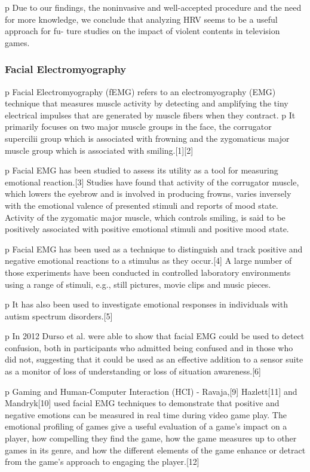 \documentclass{uofsthesis-cs}
\begin{document}
p Due to our findings, the noninvasive and well-accepted procedure and the need for more knowledge, we conclude that analyzing HRV seems to be a useful approach for fu- ture studies on the impact of violent contents in television games.



\subsubsection{Facial Electromyography}

p Facial Electromyography (fEMG) refers to an electromyography (EMG) technique that measures muscle activity by detecting and amplifying the tiny electrical impulses that are generated by muscle fibers when they contract.
p It primarily focuses on two major muscle groups in the face, the corrugator supercilii group which is associated with frowning and the zygomaticus major muscle group which is associated with smiling.[1][2]

p Facial EMG has been studied to assess its utility as a tool for measuring emotional reaction.[3] Studies have found that activity of the corrugator muscle, which lowers the eyebrow and is involved in producing frowns, varies inversely with the emotional valence of presented stimuli and reports of mood state. Activity of the zygomatic major muscle, which controls smiling, is said to be positively associated with positive emotional stimuli and positive mood state.

p Facial EMG has been used as a technique to distinguish and track positive and negative emotional reactions to a stimulus as they occur.[4] A large number of those experiments have been conducted in controlled laboratory environments using a range of stimuli, e.g., still pictures, movie clips and music pieces.

p It has also been used to investigate emotional responses in individuals with autism spectrum disorders.[5]

p In 2012 Durso et al. were able to show that facial EMG could be used to detect confusion, both in participants who admitted being confused and in those who did not, suggesting that it could be used as an effective addition to a sensor suite as a monitor of loss of understanding or loss of situation awareness.[6]

p Gaming and Human-Computer Interaction (HCI) - Ravaja,[9] Hazlett[11] and Mandryk[10] used facial EMG techniques to demonstrate that positive and negative emotions can be measured in real time during video game play. The emotional profiling of games give a useful evaluation of a game's impact on a player, how compelling they find the game, how the game measures up to other games in its genre, and how the different elements of the game enhance or detract from the game's approach to engaging the player.[12]
\end{document}
